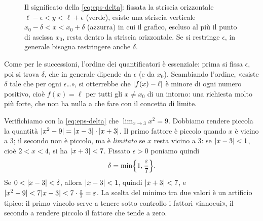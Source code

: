 \begin{figure}[htb]
\centering
{}
\caption{Il significato della \eqref{eq:eps-delta}: fissata la striscia orizzontale
$\ell-\epsilon<y<\ell+\epsilon$ (verde), esiste una striscia verticale
$x_{0}-\delta<x<x_{0}+\delta$ (azzurra) in cui il grafico, escluso al più il punto di
ascissa $x_{0}$, resta dentro la striscia orizzontale. Se si restringe $\epsilon$, in
generale bisogna restringere anche $\delta$.}
\label{fig:eps-delta}
\end{figure}

\begin{attenzione}
Come per le successioni, l'ordine dei quantificatori è essenziale: prima si fissa
$\epsilon$, poi si trova $\delta$, che in generale dipende da $\epsilon$ (e da $x_{0}$).
Scambiando l'ordine, «esiste $\delta$ tale che per ogni $\epsilon$\dots», si otterrebbe
che $\abs{f(x)-\ell}$ è minore di ogni numero positivo, cioè $f(x)=\ell$ per tutti gli
$x\neq x_{0}$ di un intorno: una richiesta molto più forte, che non ha nulla a che fare
con il concetto di limite.
\end{attenzione}

\begin{esempio}\label{es:x-quadro-eps-delta}
Verifichiamo con la \eqref{eq:eps-delta} che $\lim_{x\to3}x^{2}=9$. Dobbiamo rendere
piccola la quantità $\abs{x^{2}-9}=\abs{x-3}\cdot\abs{x+3}$. Il primo fattore è
piccolo quando $x$ è vicino a $3$; il secondo non è piccolo, ma è \emph{limitato} se
$x$ resta vicino a $3$: se $\abs{x-3}<1$, cioè $2<x<4$, si ha $\abs{x+3}<7$. Fissato
$\epsilon>0$ poniamo quindi
\[
  \delta=\min\Bigl\{1,\frac\epsilon7\Bigr\}.
\]
Se $0<\abs{x-3}<\delta$, allora $\abs{x-3}<1$, quindi $\abs{x+3}<7$, e
$\abs{x^{2}-9}<7\abs{x-3}<7\cdot\frac\epsilon7=\epsilon$. La scelta del minimo tra due
valori è un artificio tipico: il primo vincolo serve a tenere sotto controllo i fattori
«innocui», il secondo a rendere piccolo il fattore che tende a zero.
\end{esempio}

